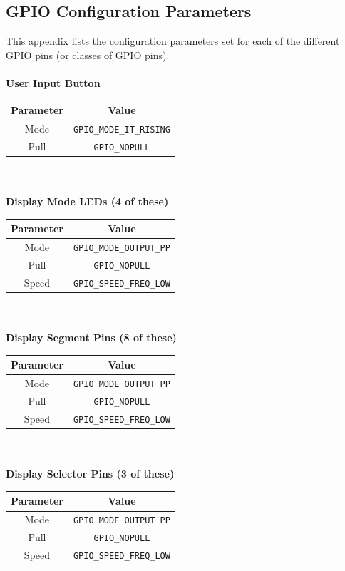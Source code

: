 \documentclass[12pt]{report}
\begin{document}
\begin{appendix}
	\chapter{GPIO Configuration Parameters}\label{appendixgpio}
	This appendix lists the configuration parameters set for each of the different GPIO pins (or
	classes of GPIO pins).\\\\
	\textbf{User Input Button}\\
	\begin{tabular}{|c|c|}
		\hline
		Parameter & Value\\\hline
		Mode & \texttt{GPIO\_MODE\_IT\_RISING}\\\hline
		Pull & \texttt{GPIO\_NOPULL}\\\hline
	\end{tabular}
	\newline
	\\\\
	\textbf{Display Mode LEDs (4 of these)}\\
	\begin{tabular}{|c|c|}
		\hline
		Parameter & Value\\\hline
		Mode & \texttt{GPIO\_MODE\_OUTPUT\_PP}\\\hline
		Pull & \texttt{GPIO\_NOPULL}\\\hline
		Speed & \texttt{GPIO\_SPEED\_FREQ\_LOW}\\\hline
	\end{tabular}
	\newline
	\\\\
	\textbf{Display Segment Pins (8 of these)}\\
	\begin{tabular}{|c|c|}
		\hline
		Parameter & Value\\\hline
		Mode & \texttt{GPIO\_MODE\_OUTPUT\_PP}\\\hline
		Pull & \texttt{GPIO\_NOPULL}\\\hline
		Speed & \texttt{GPIO\_SPEED\_FREQ\_LOW}\\\hline
	\end{tabular}
	\newline
	\\\\
	\textbf{Display Selector Pins (3 of these)}\\
	\begin{tabular}{|c|c|}
		\hline
		Parameter & Value\\\hline
		Mode & \texttt{GPIO\_MODE\_OUTPUT\_PP}\\\hline
		Pull & \texttt{GPIO\_NOPULL}\\\hline
		Speed & \texttt{GPIO\_SPEED\_FREQ\_LOW}\\\hline
	\end{tabular}
	\newline
	\newpage

\end{appendix}
\end{document}
